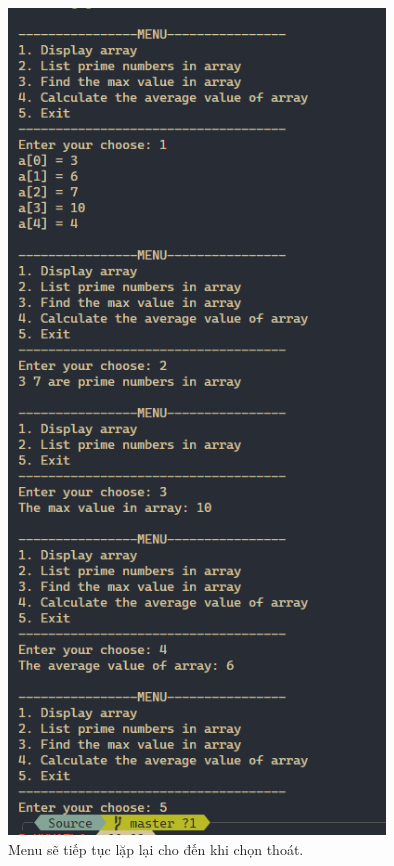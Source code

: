 \begin{figure}[H]
	\centering
	\includegraphics[width=10cm]{images/img5_6.PNG}
	\caption{Menu sẽ tiếp tục lặp lại cho đến khi chọn thoát.}

\end{figure}
